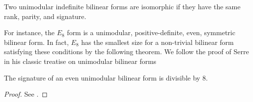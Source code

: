 \begin{theorem}\label{thm:indefinite-bilinear-forms-isomorphic}
	Two unimodular indefinite bilinear forms are isomorphic if they have the same rank, parity, and signature.
\end{theorem}

For instance, the $E_8$ form is a unimodular, positive-definite, even, symmetric bilinear form. In fact, $E_8$ has the smallest size for a non-trivial bilinear form satisfying these conditions by the following theorem. We follow the proof of Serre in his classic treatise on unimodular bilinear forms 

\begin{theorem}
	The signature of an even unimodular bilinear form is divisible by $8$.
\end{theorem}
\begin{proof}
	See \cite{serre1961forms}.
\end{proof}

